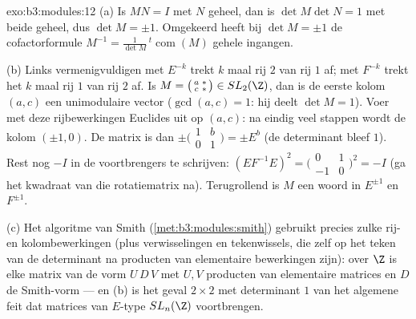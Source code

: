 \begin{solution}{exo:b3:modules:12}
(a) Is $MN = I$ met $N$ geheel, dan is $\det M\det N = 1$ met
beide geheel, dus $\det M = \pm1$. Omgekeerd heeft bij $\det M =
\pm1$ de cofactorformule $M^{-1} =
\frac1{\det M}\,{}^t\!\operatorname{com}(M)$ gehele ingangen.

(b) Links vermenigvuldigen met $E^{-k}$ trekt $k$ maal rij $2$ van
rij $1$ af; met $F^{-k}$ trekt het $k$ maal rij $1$ van rij $2$
af. Is $M = \bigl(\begin{smallmatrix}a & *\\ c &
*\end{smallmatrix}\bigr) \in SL_2(\Z)$, dan is de eerste kolom
$(a, c)$ een unimodulaire vector ($\gcd(a, c) = 1$: hij deelt
$\det M = 1$). Voer met deze rijbewerkingen Euclides uit op $(a,
c)$: na eindig veel stappen wordt de kolom $(\pm1, 0)$. De matrix
is dan $\pm \bigl(\begin{smallmatrix}1 & b\\ 0 &
1\end{smallmatrix} \bigr) = \pm E^{b}$ (de determinant bleef $1$).
Rest nog $-I$ in de voortbrengers te schrijven: $(EF^{-1}E)^2 =
\bigl(\begin{smallmatrix}0 & 1\\ -1 &
0\end{smallmatrix}\bigr)^2 = -I$ (ga het kwadraat van die
rotatiematrix na). Terugrollend is $M$ een woord in $E^{\pm1}$ en
$F^{\pm1}$.

(c) Het algoritme van Smith (\cref{met:b3:modules:smith}) gebruikt
precies zulke rij- en kolombewerkingen (plus verwisselingen en
tekenwissels, die zelf op het teken van de determinant na
producten van elementaire bewerkingen zijn): over $\Z$ is elke
matrix van de vorm $U\,D\,V$ met $U, V$ producten van elementaire
matrices en $D$ de Smith-vorm --- en (b) is het geval $2\times2$
met determinant $1$ van het algemene feit dat matrices van
$E$-type $SL_n(\Z)$ voortbrengen.
\end{solution}

